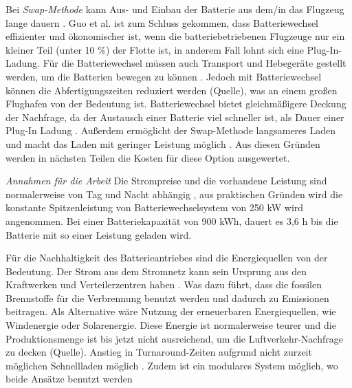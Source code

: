 Bei \textit{Swap-Methode} kann Aus- und Einbau der Batterie aus dem/in das Flugzeug lange dauern \cite{dalmia2022powering}. 
Guo et al. \cite{guo2020aviation} ist zum Schluss gekommen, dass Batteriewechsel effizienter und ökonomischer ist, 
wenn die batteriebetriebenen Flugzeuge nur ein kleiner Teil (unter 10 \%) der Flotte ist, in anderem Fall lohnt sich eine Plug-In-Ladung. 
Für die Batteriewechsel müssen auch Transport und Hebegeräte gestellt werden, um die Batterien bewegen zu können \cite{reimers2018introduction}.
Jedoch mit Batteriewechsel können die Abfertigungszeiten reduziert werden (Quelle), was an einem großen Flughafen von der Bedeutung ist. 
Batteriewechsel bietet gleichmäßigere Deckung der Nachfrage, 
da der Austausch einer Batterie viel schneller ist, als Dauer einer Plug-In Ladung \cite{guo2020aviation}. 
Außerdem ermöglicht der Swap-Methode langsameres Laden und macht das Laden mit geringer Leistung möglich \cite{avogadro2024demystifying}.
Aus diesen Gründen werden in nächsten Teilen die Kosten für diese Option ausgewertet. 

\textit{Annahmen für die Arbeit}
Die Strompreise und die vorhandene Leistung sind normalerweise von Tag und Nacht abhängig \cite{salucci2020optimal}, 
aus praktischen Gründen wird die konstante Spitzenleistung von Batteriewechselsystem von 250 kW wird angenommen. 
Bei einer Batteriekapazität von 900 kWh, dauert es 3,6 h bis die Batterie mit so einer Leistung geladen wird.


%
Für die Nachhaltigkeit des Batterieantriebes sind die Energiequellen von der Bedeutung. 
Der Strom aus dem Stromnetz kann sein Ursprung aus den Kraftwerken und Verteilerzentren haben \cite{dalmia2022powering}. 
Was dazu führt, dass die fossilen Brennstoffe für die Verbrennung benutzt werden und dadurch zu Emissionen beitragen. 
Als Alternative wäre Nutzung der erneuerbaren Energiequellen, wie Windenergie oder Solarenergie. Diese Energie ist normalerweise teurer
und die Produktionsmenge ist bis jetzt nicht ausreichend, um die Luftverkehr-Nachfrage zu decken (Quelle).
Anstieg in Turnaround-Zeiten aufgrund nicht zurzeit möglichen Schnellladen möglich \cite{avogadro2024demystifying}.
Zudem ist ein modulares System möglich, wo beide Ansätze benutzt werden \cite{salucci2020optimal.}

